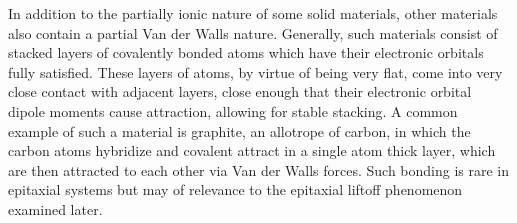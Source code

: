 In addition to the partially ionic nature of some solid materials, other materials also contain a partial Van der Walls nature. Generally, such materials consist of stacked layers of covalently bonded atoms which have their electronic orbitals fully satisfied. These layers of atoms, by virtue of being very flat, come into very close contact with adjacent layers, close enough that their electronic orbital dipole moments cause attraction, allowing for stable stacking. A common example of such a material is graphite, an allotrope of carbon, in which the carbon atoms hybridize and covalent attract in a single atom thick layer, which are then attracted to each other via Van der Walls forces. Such bonding is rare in epitaxial systems but may of relevance to the epitaxial liftoff phenomenon examined later.


